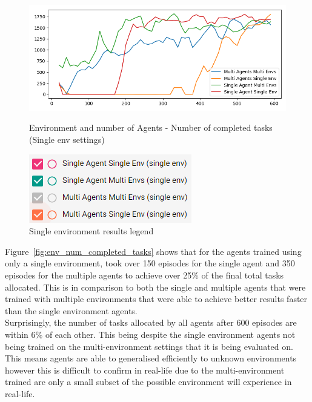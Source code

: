 \begin{figure}[H]
    \centering
    \begin{minipage}{0.75\linewidth}
        \centering
        \includegraphics[width=\linewidth]{figures/5_evaluation_figs/env_agent_num_training_fig/single_env_num_completed_tasks.png}
        \caption{Environment and number of Agents - Number of completed tasks (Single env settings)}
        \label{fig:single_env_num_completed_tasks}
    \end{minipage}\hfill
    \begin{minipage}{0.25\linewidth}
        \centering
        \includegraphics[width=\linewidth]{figures/5_evaluation_figs/env_agent_num_training_fig/single_env_legend.png}
        \caption{Single environment results legend}
        \label{fig:single_env_legend}
    \end{minipage}
\end{figure}

Figure~\ref{fig:env_num_completed_tasks} shows that for the agents trained using only a single environment, took
over 150 episodes for the single agent and 350 episodes for the multiple agents to achieve over 25\% of the final total
tasks allocated. This is in comparison to both the single and multiple agents that were trained with multiple
environments that were able to achieve better results faster than the single environment agents. \\
Surprisingly, the number of tasks allocated by all agents after 600 episodes are within 6\% of each other. This being
despite the single environment agents not being trained on the multi-environment settings that it is being evaluated on.
This means agents are able to generalised efficiently to unknown environments however this is difficult to confirm in
real-life due to the multi-environment trained are only a small subset of the possible environment will experience in
real-life.

